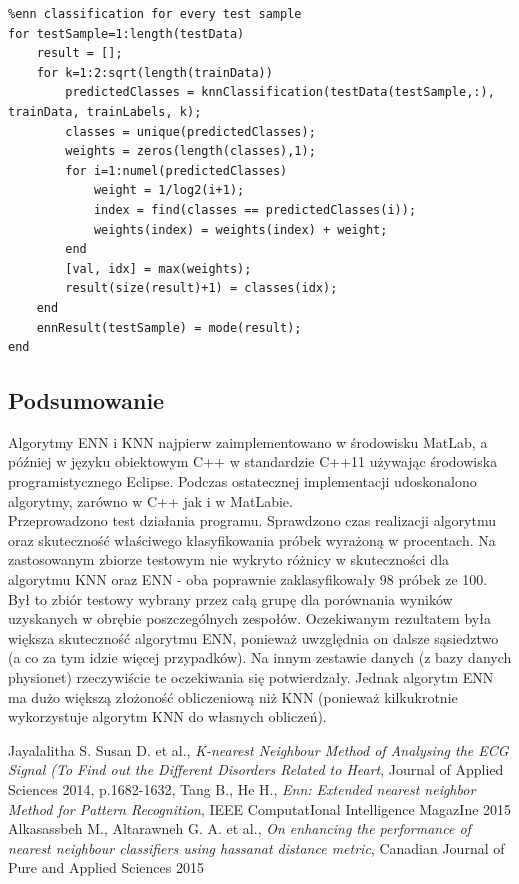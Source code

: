 \documentclass[[10pt,a4paper]{article}
\begin{document}
\begin{lstlisting}
%enn classification for every test sample
for testSample=1:length(testData)
    result = [];
    for k=1:2:sqrt(length(trainData))
        predictedClasses = knnClassification(testData(testSample,:), trainData, trainLabels, k);
        classes = unique(predictedClasses);
        weights = zeros(length(classes),1);
        for i=1:numel(predictedClasses)
            weight = 1/log2(i+1);
            index = find(classes == predictedClasses(i));
            weights(index) = weights(index) + weight;
        end
        [val, idx] = max(weights);
        result(size(result)+1) = classes(idx);
    end
    ennResult(testSample) = mode(result);
end
\end{lstlisting}


\subsection{Podsumowanie}
Algorytmy ENN i KNN najpierw zaimplementowano w środowisku MatLab, a później w języku obiektowym C++ w standardzie C++11 używając środowiska programistycznego Eclipse. Podczas ostatecznej implementacji udoskonalono algorytmy, zarówno w C++ jak i w MatLabie.\\

Przeprowadzono test działania programu. Sprawdzono czas realizacji algorytmu oraz skuteczność właściwego klasyfikowania próbek wyrażoną w procentach. Na zastosowanym zbiorze testowym nie wykryto różnicy w skuteczności dla algorytmu KNN oraz ENN - oba poprawnie zaklasyfikowały 98 próbek ze 100. Był to zbiór testowy wybrany przez całą grupę dla porównania wyników uzyskanych w obrębie poszczególnych zespołów. Oczekiwanym rezultatem była większa skuteczność algorytmu ENN, ponieważ uwzględnia on dalsze sąsiedztwo (a co za tym idzie więcej przypadków). Na innym zestawie danych (z bazy danych physionet) rzeczywiście te oczekiwania się potwierdzały. Jednak algorytm ENN ma dużo większą złożoność obliczeniową niż KNN (ponieważ kilkukrotnie wykorzystuje algorytm KNN do własnych obliczeń).

\begin{thebibliography}{99}
 Jayalalitha S. Susan D. et al., \emph{K-nearest Neighbour Method of Analysing the ECG Signal (To Find out the Different Disorders Related to Heart}, Journal of Applied Sciences 2014, p.1682-1632, 
 Tang B., He H., \emph{Enn: Extended nearest neighbor Method for Pattern Recognition}, IEEE ComputatIonal Intelligence MagazIne 2015
 Alkasassbeh M., Altarawneh G. A. et al., \emph{On enhancing the performance of nearest neighbour classifiers using hassanat distance metric}, Canadian Journal of Pure and Applied Sciences 2015
\end{thebibliography}
\end{document}
